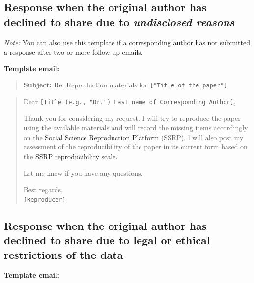 \documentclass[
  openany]{book}
\begin{document}
\hypertarget{response-when-the-original-author-has-declined-to-share-due-to-undisclosed-reasons}{%
\subsection{\texorpdfstring{Response when the original author has declined to share due to \emph{undisclosed reasons}}{Response when the original author has declined to share due to undisclosed reasons}}\label{response-when-the-original-author-has-declined-to-share-due-to-undisclosed-reasons}}

\emph{Note:} You can also use this template if a corresponding author has not submitted a response after two or more follow-up emails.

\textbf{Template email:}

\begin{quote}
\textbf{Subject:} Re: Reproduction materials for \texttt{{[}"Title\ of\ the\ paper"{]}}
\end{quote}

\begin{quote}
Dear \texttt{{[}Title\ (e.g.,\ "Dr.")\ Last\ name\ of\ Corresponding\ Author{]}},

Thank you for considering my request. I will try to reproduce the paper using the available materials and will record the missing items accordingly on the \href{https://www.socialsciencereproduction.org/}{Social Science Reproduction Platform} (SSRP). l will also post my assessment of the reproducibility of the paper in its current form based on the \href{https://bitss.github.io/ACRE/assessment.html\#levels-of-computational-reproducibility-for-a-specific-output}{SSRP reproducibility scale}.

Let me know if you have any questions.

Best regards,\\
\texttt{{[}Reproducer{]}}
\end{quote}

\hypertarget{response-when-the-original-author-has-declined-to-share-due-to-legal-or-ethical-restrictions-of-the-data}{%
\subsection{Response when the original author has declined to share due to legal or ethical restrictions of the data}\label{response-when-the-original-author-has-declined-to-share-due-to-legal-or-ethical-restrictions-of-the-data}}

\textbf{Template email:}
\end{document}
